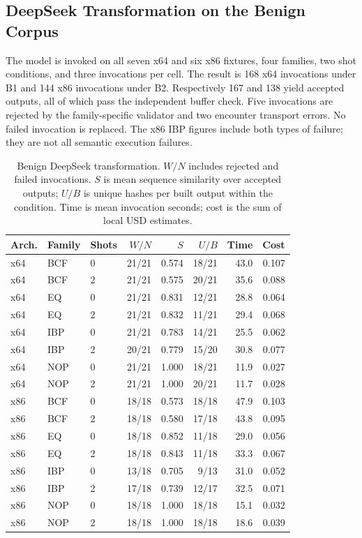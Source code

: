 \subsection{DeepSeek Transformation on the Benign Corpus}
The model is invoked on all seven x64 and six x86 fixtures, four
families, two shot conditions, and three invocations per cell. The
result is 168 x64 invocations under B1 and 144 x86 invocations under
B2. Respectively 167 and 138 yield accepted outputs, all of which
pass the independent buffer check. Five invocations are rejected by
the family-specific validator and two encounter transport errors.
No failed invocation is replaced. The x86 IBP figures include both
types of failure; they are not all semantic execution failures.

\begin{table}[t]
\caption{Benign DeepSeek transformation. $W/N$ includes rejected and
failed invocations. $S$ is mean sequence similarity over accepted outputs;
$U/B$ is unique hashes per built output within the condition. Time is
mean invocation seconds; cost is the sum of local USD estimates.}
\label{tab:new_llm_benign}
\centering\small\setlength{\tabcolsep}{4pt}
\begin{tabular}{@{}lllrrrrr@{}}
\toprule
Arch. & Family & Shots & $W/N$ & $S$ & $U/B$ & Time & Cost \\
\midrule
x64 & BCF & 0 & 21/21 & 0.574 & 18/21 & 43.0 & 0.107 \\
x64 & BCF & 2 & 21/21 & 0.575 & 20/21 & 35.6 & 0.088 \\
x64 & EQ & 0 & 21/21 & 0.831 & 12/21 & 28.8 & 0.064 \\
x64 & EQ & 2 & 21/21 & 0.832 & 11/21 & 29.4 & 0.068 \\
x64 & IBP & 0 & 21/21 & 0.783 & 14/21 & 25.5 & 0.062 \\
x64 & IBP & 2 & 20/21 & 0.779 & 15/20 & 30.8 & 0.077 \\
x64 & NOP & 0 & 21/21 & 1.000 & 18/21 & 11.9 & 0.027 \\
x64 & NOP & 2 & 21/21 & 1.000 & 20/21 & 11.7 & 0.028 \\
x86 & BCF & 0 & 18/18 & 0.573 & 18/18 & 47.9 & 0.103 \\
x86 & BCF & 2 & 18/18 & 0.580 & 17/18 & 43.8 & 0.095 \\
x86 & EQ & 0 & 18/18 & 0.852 & 11/18 & 29.0 & 0.056 \\
x86 & EQ & 2 & 18/18 & 0.843 & 11/18 & 33.3 & 0.067 \\
x86 & IBP & 0 & 13/18 & 0.705 & 9/13 & 31.0 & 0.052 \\
x86 & IBP & 2 & 17/18 & 0.739 & 12/17 & 32.5 & 0.071 \\
x86 & NOP & 0 & 18/18 & 1.000 & 18/18 & 15.1 & 0.032 \\
x86 & NOP & 2 & 18/18 & 1.000 & 18/18 & 18.6 & 0.039 \\
\bottomrule
\end{tabular}
\end{table}

